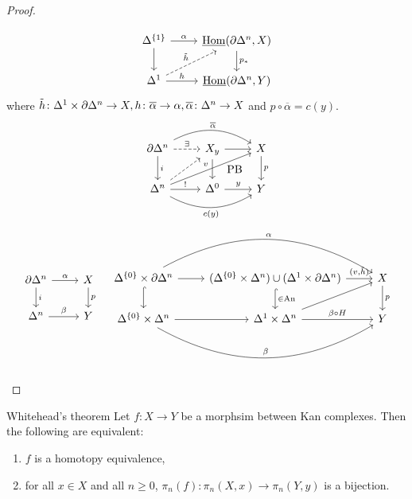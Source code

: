 \begin{proof}
\begin{itemize}[label={}]
\[\begin{tikzcd}
		\Delta^{\{1\}}
		\ar[r, "\alpha"]
		\ar[d]
		&
		\underline{\Hom}(\partial \Delta^n , X )
			\ar[d, "p_*"]
		\\
		\Delta^1
		\ar[ru, dashed , "\Tilde{h}"]
		\ar[r, "h"]
		&
		\underline{\Hom}(\partial \Delta^n , Y )
	\end{tikzcd}
	\]
	where $ \Tilde{h} \colon \Delta^1 \times \partial \Delta^n \to X , h \colon \overline{ \alpha } \to \alpha , \overline{\alpha} \colon \Delta^n \to X $ and $ p \circ \overline{\alpha} = c( y)$.
	\[
	\begin{tikzcd}
		\partial \Delta^n
		\ar[r, dashed, "\exists"]
		\ar[rr, bend left, "\overline{\alpha}"]
		\ar[d, "i"]
		&
		X_y
		\ar[d]
		\ar[r]
		\ar[d, shift left=0.7cm, phantom ,"\text{PB}"]
		&
		X
		\ar[d, "p"]
		\\
		\Delta^n
		\ar[r, "!"]
		\ar[rr, bend right, " c ( y )"']
		\ar[rru, "v"]
		\ar[ru, dashed]
		&
		\Delta^0
		\ar[r, "y"]
		&
		Y
	\end{tikzcd}
	\]
	\[
	\begin{tikzcd}
		\partial \Delta^n
		\ar[d, "i"]
		\ar[r, "\alpha"]
		&
		X
		\ar[d, "p"]
		\\
		\Delta^n
		\ar[r, "\beta"]
		&
		Y
	\end{tikzcd}
	\quad
		\begin{tikzcd}
			\Delta^{\{0\}} \times \partial \Delta^n
			\ar[rr, bend left, "\alpha"]
			\ar[r]
			\ar[d,hook]
			&
			( \Delta^{\{0\}} \times \Delta^n ) \cup ( \Delta^1 \times \partial \Delta^n )
			\ar[r, " { ( v , \Tilde{h} ) } "]
			\ar[d, hook, "\in \An"]
			&
			X
			\ar[d, "p"]
			\\
			\Delta^{\{0\}} \times \Delta^n
			\ar[r]
			\ar[rr, bend right, "\beta"]
			&
			\Delta^1 \times \Delta^n
			\ar[ru]
			\ar[r, " \beta \circ H"]
			&
			Y
		\end{tikzcd}
	\]
\end{itemize}
\end{proof}

\begin{thm}{Whitehead's theorem}
Let $f\colon X \to Y$ be a morphsim between Kan complexes. 
Then the following are equivalent:
    \begin{enumerate}
        \item 
        $f$ is a homotopy equivalence,
        \item 
        for all $x \in X$ and all $n \geq 0$, $\pi_n(f)\colon  \pi_n(X,x) \to \pi_n(Y,y)$ is a bijection.
    \end{enumerate}
\end{thm}

